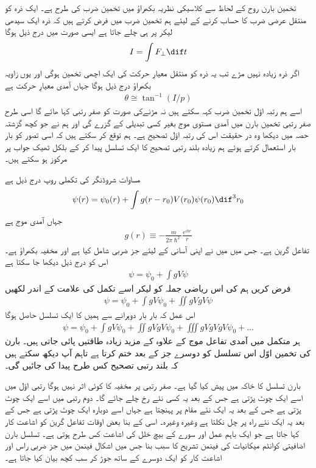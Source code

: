 
تخمین بارن روح کے لحاظ سے کلاسیکی نظریہ بکھراؤ میں تخمین ضرب کی طرح ہے۔ ایک ذرہ کو منتقل عرضی ضرب کا حساب کرنے کے لیئے ہم تخمین ضرب میں فرض کرتے ہیں کہ ذرہ ایک سیدھی لیکر پر ہی چلے جاتا ہے  ایسی صورت میں درج ذیل ہوگا
\begin{align}
	I=\int F_\perp\dif t
\end{align}
اگر ذرہ زیادہ نہیں مڑے تب یہ ذرہ کو منتقل معیارِ حرکت کی ایک اچھی تخمین ہوگی اور یوں زاویہ بکھراؤ درج ذیل ہوگا جہاں  آمدی معیارِ حرکت ہے 
\begin{align}
	\theta\cong\tan^{-1}(I/p)
\end{align}
اسے ہم رتبہ اوّل تخمین ضرب کہہ سکتے ہیں نہ مڑنےکی صورت کو صفر رتبی کہا ھائے گا اسی طرح صفر رتبی تخمین بارن میں آمدی مستوی موج بغیر کسی تبدیلی کے گزرے گی اور ہم نے جو کچھ گزشتہ حصہ میں دیکھا وہ در حقیقت اس کی رتبہ اوّل تصحیح ہے۔ ہم توقع کر سکتے ہیں کہ اسی تصور کو بار بار استعمال کرتے ہوئے ہم زیادہ بلند رتبی تصحیح کا ایک تسلسل پیدا کر کے بلکل ٹھیک جواب پر مرکوز ہو سکتے ہیں۔

مساوات شروڈنگر کی تکملی روپ درج ذیل ہے
\begin{align}
	\psi(r)=\psi_0(r)+\int g(r-r_0)V(r_0)\psi(r_0)\dif^3r_0
\end{align}
جہاں  آمدی موج ہے
\begin{align}
	g(r)\equiv-\frac{m}{2\pi\hslash^2}\frac{e^{ikr}}{r}
\end{align}
تفاعل گرین ہے۔ جس میں میں نے اپنی آسانی کے لیئے جز ضربی  شامل کیا ہے اور  مخفیہ بکھراؤ ہے۔ اس کو درج ذیل دیکھا جا سکتا ہے
\begin{align}
	\psi = \psi_0+\int gV\psi
\end{align}
فرض کریں ہم  کی اس ریاضی جملہ کو لیکر اسے تکمل کی علامت کے اندر لکھیں 
\begin{align}
	\psi=\psi_0+\int gV\psi_0+\iint gVgV\psi
\end{align}
اس عمل کہ بار بار دوہرانے سے ہمیں  کا ایک تسلسل حاصل ہوگا
\begin{align}
	\psi=\psi_0+\int gV\psi_0+\iint gVgV\psi_0+\iiint gVgVgV\psi_0+\dots
\end{align}
ہر متکمل میں آمدی تفاعل موج  کے علاوہ  کے مزید زیادہ طاقتیں پائی جاتی ہیں۔ بارن کی تخمین اوّل اس تسلسل کو دوسرے جز کے بعد ختم کرتا ہے تاہم آپ دیکھ سکتے ہیں کہ بلند رتبی تصحیح کس طرح پیدا کی جائیں گی۔

بارن تسلسل کا خاکہ  میں پیش کیا گیا ہے۔ صفر رتبی  پر مخفیہ کا کوئی اثر نہیں ہوگا رتبی اوّل میں اسے ایک چوٹ پڑتی ہے جس کے بعد یہ کسی نئے رخ چلے جائے گا۔ دوم رتبی میں اسے ایک چوٹ پڑتی ہے جس کے بعد یہ ایک نئے مقام پر پہنچتا ہے جہاں اسے دوبارہ ایک چوٹ پڑتی ہے جس کے بعد یہ ایک نئے راہ پر چل نکلتا ہے وغیرہ وغیرہ۔ اسی کے بنا بعض اوقات تفاعل گرین کو اشاعت کار کہا جاتا ہے جو ایک باہم عمل اور سورے کے بیچ خلل کی اشاعت کس طرح ہوتی ہے۔ تسلسل بارن اضافیتی کوانٹم میکانیات کی فینمن تشریح کا سبب بنا جس میں اشکال فینمن میں جز ضربی راس  اور اشاعت کار  کو ایک دوسرے کے ساتھ جوڑ کر سب کچھ بیان کیا جاتا ہے۔

